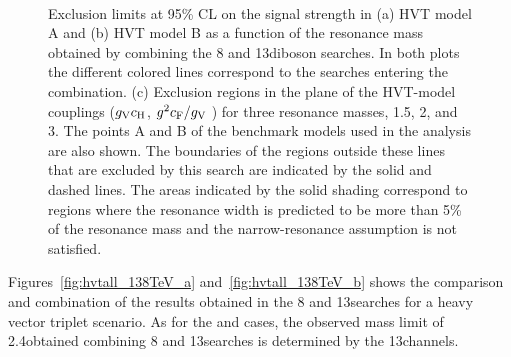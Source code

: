 \begin{figure}[!htb]
\centering
{}
\\
\caption{
Exclusion limits at 95\% CL on the signal strength in (a) HVT model A and (b) HVT model B as a function of the resonance mass obtained by combining the 8 and 13\TeV diboson searches. In both plots the different colored lines correspond to the searches entering the combination.
(c) Exclusion regions in the plane of the HVT-model couplings ($g_{\rm V}c_{\rm H}$, $g^2c_{\rm F}/g_{\rm V}$ ) for three resonance masses, 1.5, 2, and 3\TeV.
The points A and B of the benchmark models used in the analysis are also shown.
The boundaries of the regions outside these lines that are excluded by this search are indicated by the solid and dashed lines.
The areas indicated by the solid shading correspond to regions where the resonance width is predicted to be more than 5\% of the resonance mass and the narrow-resonance assumption is not satisfied.
}
\label{fig:hvtall_138TeV}
\end{figure}

Figures~\ref{fig:hvtall_138TeV_a} and~\ref{fig:hvtall_138TeV_b} shows the comparison and combination of the results obtained in the 8 and 13\TeV searches for a heavy vector triplet scenario.
As for the \Wpr and \Zpr cases, the observed mass limit of 2.4\TeV obtained combining 8 and 13\TeV searches is determined by the 13\TeV channels.

